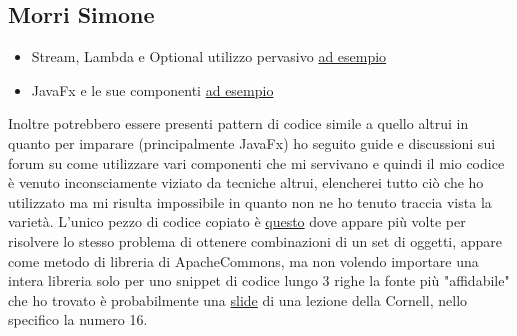 \documentclass[a4paper,12pt]{report}
\begin{document}
\subsection{Morri Simone}
\begin{itemize}
    \item Stream, Lambda e Optional utilizzo pervasivo \href{https://github.com/MoneIsProgrammer/risiko/blob/1ef3e0756d3ff5c10e6d098ca0f10d445c8c83aa/src/main/java/it/unibo/risiko/model/player/strategy/ai/AggressiveStrategy.java#L67-L94}{ad esempio}
    \item JavaFx e le sue componenti \href{https://github.com/MoneIsProgrammer/risiko/blob/1ef3e0756d3ff5c10e6d098ca0f10d445c8c83aa/src/main/java/it/unibo/risiko/view/PlayerSelectScene.java#L176-L223}{ad esempio}

\end{itemize}
Inoltre potrebbero essere presenti pattern di codice simile a quello altrui in quanto per imparare (principalmente JavaFx) ho seguito guide e discussioni sui forum su come utilizzare vari componenti che mi servivano e quindi il mio codice è venuto inconsciamente viziato da tecniche altrui, elencherei tutto ciò che ho utilizzato ma mi risulta impossibile in quanto non ne ho tenuto traccia vista la varietà. L'unico pezzo di codice copiato è \href{https://github.com/MoneIsProgrammer/risiko/blob/1ef3e0756d3ff5c10e6d098ca0f10d445c8c83aa/src/main/java/it/unibo/risiko/model/player/strategy/StrategyUtils.java#L106-L108}{questo} dove appare più volte per risolvere lo stesso problema di ottenere combinazioni di un set di oggetti, appare come metodo di libreria di ApacheCommons, ma non volendo importare una intera libreria solo per uno snippet di codice lungo 3 righe la fonte più "affidabile" che ho trovato è probabilmente una \href{https://www.cs.cornell.edu/courses/cs1112/2011sp/Notes/egL20/L20post.pdf?}{slide} di una lezione della Cornell, nello specifico la numero 16.
\end{document}
